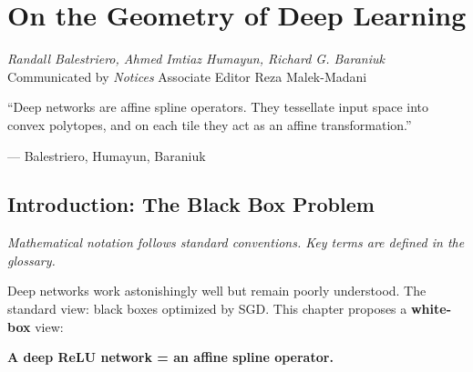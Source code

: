 \chapter{On the Geometry of Deep Learning}
\label{ch:dl_geometry}

\begin{flushright}
\textit{Randall Balestriero, Ahmed Imtiaz Humayun, Richard G. Baraniuk}\\
Communicated by \textit{Notices} Associate Editor Reza Malek-Madani
\end{flushright}

\epigraph{``Deep networks are affine spline operators. They tessellate input space into convex polytopes, and on each tile they act as an affine transformation.''}{--- Balestriero, Humayun, Baraniuk}

\begin{abstract}
This chapter develops a geometric theory of deep ReLU networks: they are \textbf{affine spline mappings} that partition input space into convex polytopes (tiles) and apply a distinct affine transformation on each. This perspective explains generalization, batch normalization, grokking, and generative model bias---and yields practical tools like SplineCam for visualization and MaGNET for debiasing, \cite{balestriero2025geometry}.
\end{abstract}

\section{Introduction: The Black Box Problem}

\noindent\textit{Mathematical notation follows standard conventions. Key terms are defined in the glossary.}\n
\label{sec:dl:intro}

Deep networks work astonishingly well but remain poorly understood. The standard view: black boxes optimized by SGD. This chapter proposes a \textbf{white-box} view:

\begin{center}
\textbf{A deep ReLU network = an affine spline operator.} \cite{balestriero2025geometry}
\end{center}

